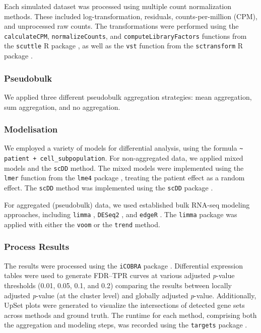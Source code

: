 \documentclass[a4paper, 11pt, twocolumn]{article}
\begin{document}
Each simulated dataset was processed using multiple count normalization methods. These included log-transformation, residuals, counts-per-million (CPM), and unprocessed raw counts. The transformations were performed using the \texttt{calculateCPM}, \texttt{normalizeCounts}, and \texttt{computeLibraryFactors} functions from the \texttt{scuttle} R package \citep{scatter}, as well as the \texttt{vst} function from the \texttt{sctransform} R package \citep{sctrans}.

\subsubsection{Pseudobulk}

We applied three different pseudobulk aggregation strategies: mean aggregation, sum aggregation, and no aggregation.

\subsubsection{Modelisation}

We employed a variety of models for differential analysis, using the formula \texttt{\textasciitilde{} patient + cell\_subpopulation}. For non-aggregated data, we applied mixed models and the \texttt{scDD} method. The mixed models were implemented using the \texttt{lmer} function from the \texttt{lme4} package \citep{lme4}, treating the patient effect as a random effect. The \texttt{scDD} method was implemented using the \texttt{scDD} package \citep{scdd}.

For aggregated (pseudobulk) data, we used established bulk RNA-seq modeling approaches, including \texttt{limma} \citep{limma}, \texttt{DESeq2} \citep{deseq2}, and \texttt{edgeR} \citep{edger}. The \texttt{limma} package was applied with either the \texttt{voom} or the \texttt{trend} method.

\subsubsection{Process Results}

The results were processed using the \texttt{iCOBRA} package \citep{icobra}. Differential expression tables were used to generate FDR–TPR curves at various adjusted \textit{p}-value thresholds (0.01, 0.05, 0.1, and 0.2) comparing the results between locally adjusted \textit{p}-value (at the cluster level) and globally adjusted \textit{p}-value. Additionally, UpSet plots were generated to visualize the intersections of detected gene sets across methods and ground truth. The runtime for each method, comprising both the aggregation and modeling steps, was recorded using the \texttt{targets} package \citep{targets}.
	
\end{document}
